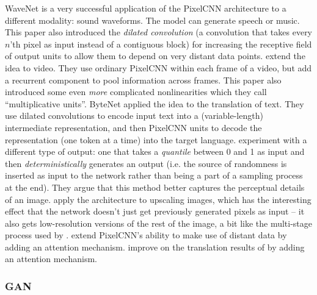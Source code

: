 \documentclass[11pt, a4paper]{book}
\newcommand{\nquote}[1]{``{#1}''}
\begin{document}
WaveNet \citep{wavenet} is a very successful application of the PixelCNN architecture to a different modality: sound waveforms. The model can generate speech or music. This paper also introduced the \emph{dilated convolution} (a convolution that takes every $n$'th pixel as input instead of a contiguous block) for increasing the receptive field of output units to allow them to depend on very distant data points. \citet{videopixel} extend the idea to video. They use ordinary PixelCNN within each frame of a video, but add a recurrent component to pool information across frames. This paper also introduced some even \emph{more} complicated nonlinearities which they call \nquote{multiplicative units}. ByteNet \citet{bytenet} applied the idea to the translation of text. They use dilated convolutions to encode input text into a (variable-length) intermediate representation, and then PixelCNN units to decode the representation (one token at a time) into the target language. \citet{quantile} experiment with a different type of output: one that takes a \emph{quantile} between 0 and 1 as input and then \emph{deterministically} generates an output (i.e. the source of randomness is inserted as input to the network rather than being a part of a sampling process at the end). They argue that this method better captures the perceptual details of an image. \citet{superres} apply the architecture to upscaling images, which has the interesting effect that the network doesn't just get previously generated pixels as input -- it also gets low-resolution versions of the rest of the image, a bit like the multi-stage process used by \citet{pixelcnn1}. \citet{pixelsnail} extend PixelCNN's ability to make use of distant data by adding an attention mechanism. \citet{fbtranslate} improve on the translation results of \citet{bytenet} by adding an attention mechanism.

\subsubsection{GAN}
\end{document}
